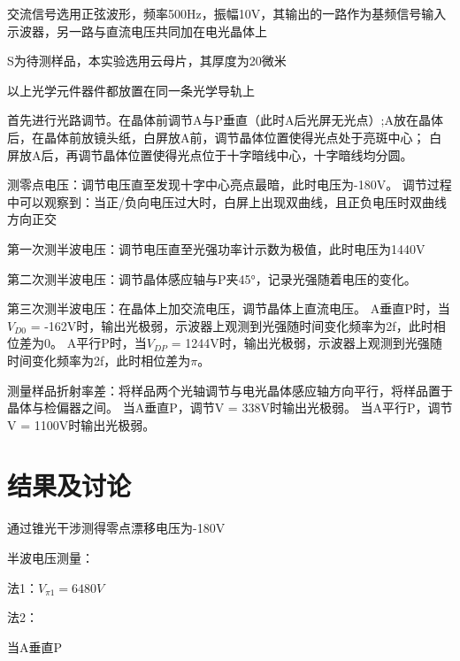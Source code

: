 \documentclass[font=default]{mpltx}
\begin{document}
交流信号选用正弦波形，频率500Hz，振幅10V，其输出的一路作为基频信号输入示波器，另一路与直流电压共同加在电光晶体上

S为待测样品，本实验选用云母片，其厚度为20微米

以上光学元件器件都放置在同一条光学导轨上

首先进行光路调节。在晶体前调节A与P垂直（此时A后光屏无光点）;A放在晶体后，在晶体前放镜头纸，白屏放A前，调节晶体位置使得光点处于亮斑中心；
白屏放A后，再调节晶体位置使得光点位于十字暗线中心，十字暗线均分圆。

测零点电压：调节电压直至发现十字中心亮点最暗，此时电压为-180V。
调节过程中可以观察到：当正/负向电压过大时，白屏上出现双曲线，且正负电压时双曲线方向正交

第一次测半波电压：调节电压直至光强功率计示数为极值，此时电压为1440V

第二次测半波电压：调节晶体感应轴与P夹45°，记录光强随着电压的变化。

第三次测半波电压：在晶体上加交流电压，调节晶体上直流电压。
A垂直P时，当$V_{D0}$ = -162V时，输出光极弱，示波器上观测到光强随时间变化频率为2f，此时相位差为0。
A平行P时，当$V_{DP}$ = 1244V时，输出光极弱，示波器上观测到光强随时间变化频率为2f，此时相位差为$\pi$。

测量样品折射率差：将样品两个光轴调节与电光晶体感应轴方向平行，将样品置于晶体与检偏器之间。
当A垂直P，调节V = 338V时输出光极弱。
当A平行P，调节V = 1100V时输出光极弱。



\section{结果及讨论}
通过锥光干涉测得零点漂移电压为-180V

半波电压测量：

法1：$V_{\pi1} = 6480V$

法2：

当A垂直P
\end{document}
